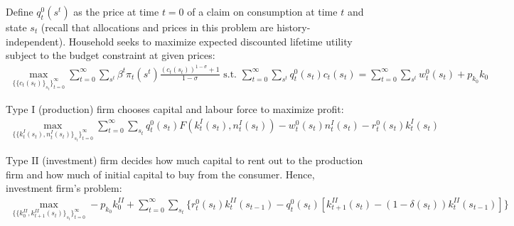 \documentclass[]{article}
\begin{document}
\subsubsection{}

Define $q_t^0(s^t)$ as the price at time $t = 0$ of a claim on consumption at time $t$ and state $s_t$ (recall that allocations and prices in this problem are history-independent). Household seeks to maximize expected discounted lifetime utility subject to the budget constraint at given prices:
\begin{equation}
	\begin{split}
		\max\limits_{\{\{c_t(s_t)\}_{s_t}\}_{t = 0}^\infty}\sum\limits_{t = 0}^\infty\sum\limits_{s^t}\beta^t\pi_t(s^t)\frac{(c_t(s_t))^{1 - \sigma} + 1}{1 - \sigma}\text{ s.t. }\sum\limits_{t = 0}^\infty\sum\limits_{s^t} q_t^0(s_t)c_t(s_t) = \sum\limits_{t = 0}^\infty\sum\limits_{s^t}w_t^0(s_t) + p_{k_0}k_0 \nonumber
	\end{split}
\end{equation}

Type I (production) firm chooses capital and labour force to maximize profit:
\begin{equation}
	\begin{split}
		\max\limits_{\{\{k_t^I(s_t), n_t^I(s_t)\}_{s_t}\}_{t = 0}^\infty}\sum\limits_{t = 0}^\infty\sum\limits_{s_t}q_t^0(s_t)F(k_t^I(s_t), n_t^I(s_t)) - w_t^0(s_t)n_t^I(s_t) - r_t^0(s_t)k_t^I(s_t) \nonumber
	\end{split}
\end{equation}

Type II (investment) firm decides how much capital to rent out to the production firm and how much of initial capital to buy from the consumer. Hence, investment firm's problem:
\begin{equation}
	\begin{split}
		\max\limits_{\{\{k_0^{II}, k_{t+1}^{II}(s_t)\}_{s_t}\}_{t = 0}^\infty} -p_{k_0}k_0^{II} + \sum\limits_{t = 0}^\infty\sum\limits_{s_t}\{r_t^0(s_t)k_t^{II}(s_{t-1}) - q_t^0(s_t)[k_{t+1}^{II}(s_t) - (1 - \delta(s_t))k_t^{II}(s_{t-1})]\} \nonumber
	\end{split}
\end{equation}
\end{document}
